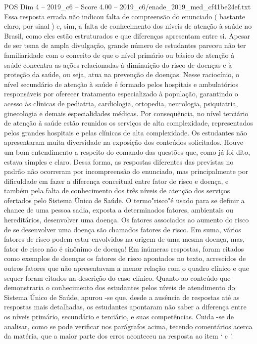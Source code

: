 \begin{textsample}{POS Dim 4 – 2019\_c6 – Score 4.00 – 2019\_c6/enade\_2019\_med\_cf41be24ef.txt}
Essa resposta errada não indicou falta de compreensão do enunciado ( bastante claro, por sinal ) e, sim, a falta de conhecimento dos níveis de atenção à saúde no Brasil, como eles estão estruturados e que diferenças apresentam entre si.
Apesar de ser tema de ampla divulgação, grande número de estudantes pareceu não ter familiaridade com o conceito de que o nível primário ou básico de atenção à saúde concentra as ações relacionadas à diminuição do risco de doenças e à proteção da saúde, ou seja, atua na prevenção de doenças.
Nesse raciocínio, o nível secundário de atenção à saúde é formado pelos hospitais e ambulatórios responsáveis por oferecer tratamento especializado à população, garantindo o acesso às clínicas de pediatria, cardiologia, ortopedia, neurologia, psiquiatria, ginecologia e demais especialidades médicas.
Por consequência, no nível terciário de atenção à saúde estão reunidos os serviços de alta complexidade, representados pelos grandes hospitais e pelas clínicas de alta complexidade.
Os estudantes não apresentaram muita diversidade na exposição dos conteúdos solicitados.
Houve um bom entendimento a respeito do comando das questões que, como já foi dito, estava simples e claro.
Dessa forma, as respostas diferentes das previstas no padrão não ocorreram por incompreensão do enunciado, mas principalmente por dificuldade em fazer a diferença conceitual entre fator de risco e doença, e também pela falta de conhecimento dos três níveis de atenção dos serviços ofertados pelo Sistema Único de Saúde.
O termo"risco"é usado para se definir a chance de uma pessoa sadia, exposta a determinados fatores, ambientais ou hereditários, desenvolver uma doença.
Os fatores associados ao aumento do risco de se desenvolver uma doença são chamados fatores de risco.
Em suma, vários fatores de risco podem estar envolvidos na origem de uma mesma doença, mas, fator de risco não é sinônimo de doença!
Em inúmeras respostas, foram citados como exemplos de doenças os fatores de risco apontados no texto, acrescidos de outros fatores que não apresentavam a menor relação com o quadro clínico e que sequer foram citados na descrição do caso clínico.
Quanto ao conteúdo que demonstraria o conhecimento dos estudantes pelos níveis de atendimento do Sistema Único de Saúde, apurou -se que, desde a ausência de respostas até as respostas mais detalhadas, os estudantes apontaram não saber a diferença entre os níveis primário, secundário e terciário, e suas competências.
Cuida -se de analisar, como se pode verificar nos parágrafos acima, tecendo comentários acerca da matéria, que a maior parte dos erros aconteceu na resposta ao item ‘ c ’.

\end{textsample}
